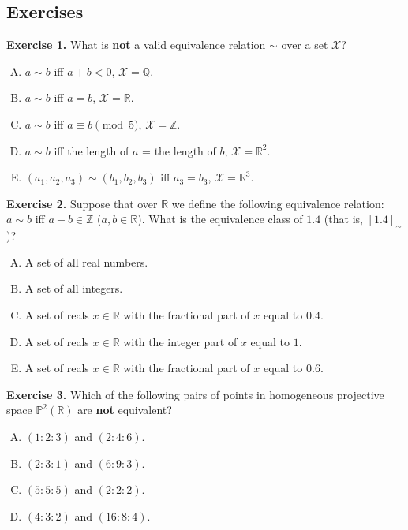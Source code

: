 \documentclass[../lecture-notes.tex]{subfiles}
\begin{document}
\subsection{Exercises}

\textbf{Exercise 1.} What is \textbf{not} a valid equivalence relation $\sim$ over a set $\mathcal{X}$?
\begin{enumerate}[(A)]
    \item $a \sim b$ iff $a+b < 0$, $\mathcal{X} = \mathbb{Q}$.
    \item $a\sim b$ iff $a=b$, $\mathcal{X} = \mathbb{R}$.
    \item $a\sim b$ iff $a \equiv b \pmod{5}$, $\mathcal{X} = \mathbb{Z}$.
    \item $a\sim b$ iff the length of $a$ = the length of $b$, $\mathcal{X} = \mathbb{R}^2$.
    \item $(a_1,a_2,a_3)\sim (b_1,b_2,b_3)$ iff $a_3=b_3$, $\mathcal{X} = \mathbb{R}^3$.
\end{enumerate}

\textbf{Exercise 2.} Suppose that over $\mathbb{R}$ we define the following equivalence relation: $a \sim b$ iff $a-b \in \mathbb{Z}$ ($a,b \in \mathbb{R}$). What is the equivalence class of $1.4$ (that is, $[1.4]_{\sim}$)?
\begin{enumerate}[(A)]
    \item A set of all real numbers.
    \item A set of all integers.
    \item A set of reals $x \in \mathbb{R}$ with the fractional part of $x$ equal to $0.4$.
    \item A set of reals $x \in \mathbb{R}$ with the integer part of $x$ equal to $1$.
    \item A set of reals $x \in \mathbb{R}$ with the fractional part of $x$ equal to $0.6$.
\end{enumerate}

\textbf{Exercise 3.} Which of the following pairs of points in homogeneous projective space $\mathbb{P}^2(\mathbb{R})$ are \textbf{not} equivalent?
\begin{enumerate}[(A)]
    \item $(1:2:3)$ and $(2:4:6)$.
    \item $(2:3:1)$ and $(6:9:3)$.
    \item $(5:5:5)$ and $(2:2:2)$.
    \item $(4:3:2)$ and $(16:8:4)$.
\end{enumerate}
\end{document}
